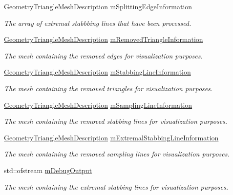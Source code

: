 \begin{DoxyCompactItemize}
\mbox{\hyperlink{structvisilib_1_1_geometry_triangle_mesh_description}{Geometry\+Triangle\+Mesh\+Description}} \mbox{\hyperlink{classvisilib_1_1_helper_visual_debugger_ad728baaee2934cbade4b9f987a19de36}{m\+Splitting\+Edge\+Information}}
\begin{DoxyCompactList}\small\item\em The array of extremal stabbbing lines that have been processed. \end{DoxyCompactList}\item 
\mbox{\hyperlink{structvisilib_1_1_geometry_triangle_mesh_description}{Geometry\+Triangle\+Mesh\+Description}} \mbox{\hyperlink{classvisilib_1_1_helper_visual_debugger_ac9be4c9101138a3133835729a7226428}{m\+Removed\+Triangle\+Information}}
\begin{DoxyCompactList}\small\item\em The mesh containing the removed edges for visualization purposes. \end{DoxyCompactList}\item 
\mbox{\hyperlink{structvisilib_1_1_geometry_triangle_mesh_description}{Geometry\+Triangle\+Mesh\+Description}} \mbox{\hyperlink{classvisilib_1_1_helper_visual_debugger_ac5bc178cf799f6b894b26fe2cc9e20a2}{m\+Stabbing\+Line\+Information}}
\begin{DoxyCompactList}\small\item\em The mesh containing the removed triangles for visualization purposes. \end{DoxyCompactList}\item 
\mbox{\hyperlink{structvisilib_1_1_geometry_triangle_mesh_description}{Geometry\+Triangle\+Mesh\+Description}} \mbox{\hyperlink{classvisilib_1_1_helper_visual_debugger_ad4d6c94e916f2cceb8fb0534dad8b07f}{m\+Sampling\+Line\+Information}}
\begin{DoxyCompactList}\small\item\em The mesh containing the removed stabbing lines for visualization purposes. \end{DoxyCompactList}\item 
\mbox{\hyperlink{structvisilib_1_1_geometry_triangle_mesh_description}{Geometry\+Triangle\+Mesh\+Description}} \mbox{\hyperlink{classvisilib_1_1_helper_visual_debugger_a7bc0c408a8a6da48b78bb203c1f0bb27}{m\+Extremal\+Stabbing\+Line\+Information}}
\begin{DoxyCompactList}\small\item\em The mesh containing the removed sampling lines for visualization purposes. \end{DoxyCompactList}\item 
std\+::ofstream \mbox{\hyperlink{classvisilib_1_1_helper_visual_debugger_a4c455f1401a41401c583e699128c833f}{m\+Debug\+Output}}
\begin{DoxyCompactList}\small\item\em The mesh containing the extremal stabbing lines for visualization purposes. \end{DoxyCompactList}\end{DoxyCompactItemize}


